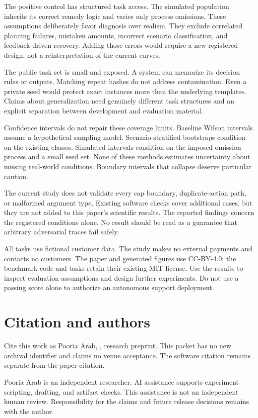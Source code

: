 \documentclass{article}
\begin{document}
The positive control has structured task access. The simulated population inherits its correct remedy logic and varies only process omissions. These assumptions deliberately favor diagnosis over realism. They exclude correlated planning failures, mistaken amounts, incorrect scenario classification, and feedback-driven recovery. Adding those errors would require a new registered design, not a reinterpretation of the current curves.

The public task set is small and exposed. A system can memorize its decision rules or outputs. Matching repeat hashes do not address contamination. Even a private seed would protect exact instances more than the underlying templates. Claims about generalization need genuinely different task structures and an explicit separation between development and evaluation material.

Confidence intervals do not repair these coverage limits. Baseline Wilson intervals assume a hypothetical sampling model. Scenario-stratified bootstraps condition on the existing classes. Simulated intervals condition on the imposed omission process and a small seed set. None of these methods estimates uncertainty about missing real-world conditions. Boundary intervals that collapse deserve particular caution.

The current study does not validate every cap boundary, duplicate-action path, or malformed argument type. Existing software checks cover additional cases, but they are not added to this paper's scientific results. The reported findings concern the registered conditions alone. No result should be read as a guarantee that arbitrary adversarial traces fail safely.

All tasks use fictional customer data. The study makes no external payments and contacts no customers. The paper and generated figures use CC-BY-4.0; the benchmark code and tasks retain their existing MIT license. Use the results to inspect evaluation assumptions and design further experiments. Do not use a passing score alone to authorize an autonomous support deployment.
\section{Citation and authors}
Cite this work as Pooria Arab, \emph{\paperTitle}, research preprint. This packet has no new archival identifier and claims no venue acceptance. The software citation remains separate from the paper citation.

Pooria Arab is an independent researcher. AI assistance supports experiment scripting, drafting, and artifact checks. This assistance is not an independent human review. Responsibility for the claims and future release decisions remains with the author.
\end{document}
